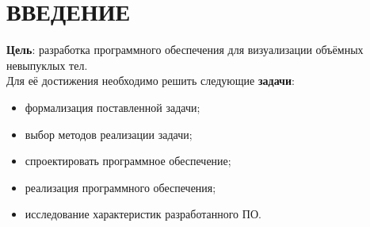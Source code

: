 \chapter*{ВВЕДЕНИЕ}
\textbf{Цель}: разработка программного обеспечения для визуализации
объёмных невыпуклых тел. \\
Для её достижения необходимо решить следующие \textbf{задачи}:
\begin{itemize}
    \item формализация поставленной задачи;
    \item выбор методов реализации задачи;
    \item спроектировать программное обеспечение;
    \item реализация программного обеспечения;
    \item исследование характеристик разработанного ПО.
\end{itemize}
